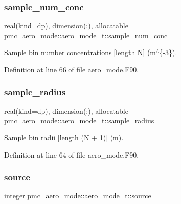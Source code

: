 \subsubsection{\texorpdfstring{sample\+\_\+num\+\_\+conc}{sample\_num\_conc}}
{\footnotesize\ttfamily real(kind=dp), dimension(\+:), allocatable pmc\+\_\+aero\+\_\+mode\+::aero\+\_\+mode\+\_\+t\+::sample\+\_\+num\+\_\+conc}



Sample bin number concentrations \mbox{[}length {\ttfamily N}\mbox{]} (m$^\wedge$\{-\/3\}). 



Definition at line 66 of file aero\+\_\+mode.\+F90.

\mbox{\label{structpmc__aero__mode_1_1aero__mode__t_abe8c0d5e3a49d9da93fb1b0b5d3c3dd0}} 
\subsubsection{\texorpdfstring{sample\+\_\+radius}{sample\_radius}}
{\footnotesize\ttfamily real(kind=dp), dimension(\+:), allocatable pmc\+\_\+aero\+\_\+mode\+::aero\+\_\+mode\+\_\+t\+::sample\+\_\+radius}



Sample bin radii \mbox{[}length {\ttfamily (N + 1)}\mbox{]} (m). 



Definition at line 64 of file aero\+\_\+mode.\+F90.

\mbox{\label{structpmc__aero__mode_1_1aero__mode__t_a45c2763552f691a96adffa91af895bf6}} 
\subsubsection{\texorpdfstring{source}{source}}
{\footnotesize\ttfamily integer pmc\+\_\+aero\+\_\+mode\+::aero\+\_\+mode\+\_\+t\+::source}




